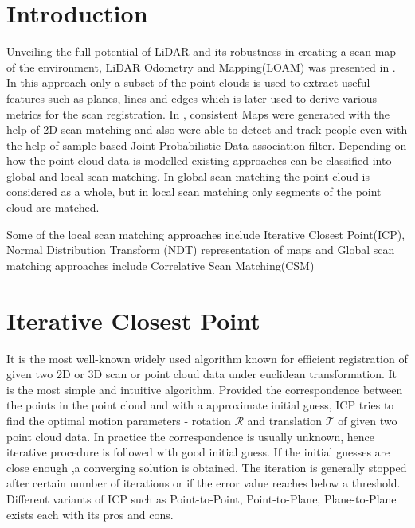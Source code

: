 \section*{Introduction}
Unveiling the full potential of LiDAR and its robustness in creating a scan map of the environment,
LiDAR Odometry and Mapping(LOAM) was presented in \cite{ZhangS14}. In this approach only a subset of the point clouds is used to extract useful features such as planes, lines and edges which is later 
used to derive various metrics for the scan registration. In \cite{D.Hahnel}, consistent Maps were generated with the help of 2D scan matching and also were able to detect and track people
even with the help of sample based Joint Probabilistic Data association filter.
Depending on how the point cloud data is modelled existing approaches can be classified into 
global and local scan matching. In global scan matching the point cloud is considered as a whole, but in local scan matching only segments of the point cloud are matched.

Some of the local scan matching approaches include Iterative Closest Point(ICP), Normal  Distribution Transform (NDT) representation of maps and Global scan matching approaches include Correlative Scan Matching(CSM)

\section{Iterative Closest Point}
It is the most well-known widely used algorithm known for  efficient registration of given two 2D or 3D scan or point cloud data under euclidean transformation. It is the most simple and intuitive algorithm. Provided the correspondence between the points in the point cloud and with a  approximate initial guess, ICP tries to find the optimal motion parameters - rotation $\mathcal{R}$ and translation $\mathcal{T}$ of given two point cloud data. In practice the correspondence is usually unknown, hence iterative procedure is followed with good initial guess. If the initial guesses are close enough ,a converging solution is obtained. The iteration is generally stopped after certain number of iterations or if the error value reaches below a threshold. Different variants of ICP such as Point-to-Point, Point-to-Plane, Plane-to-Plane exists each with its pros and cons. 

